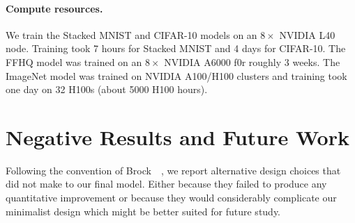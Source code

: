 \vspace{-0.1cm}
\paragraph{Compute resources.}
We train the Stacked MNIST and CIFAR-10 models on an $8\times$ NVIDIA L40 node. Training took 7 hours for Stacked MNIST and 4 days for CIFAR-10. The FFHQ model was trained on an $8\times$ NVIDIA A6000 f0r roughly 3 weeks. The ImageNet model was trained on NVIDIA A100/H100 clusters and training took one day on 32 H100s (about 5000 H100 hours).



\section{Negative Results and Future Work}
Following the convention of Brock~\etal~\cite{biggan}, we report alternative design choices that did not make to our final model. Either because they failed to produce any quantitative improvement or because they would considerably complicate our minimalist design which might be better suited for future study.
